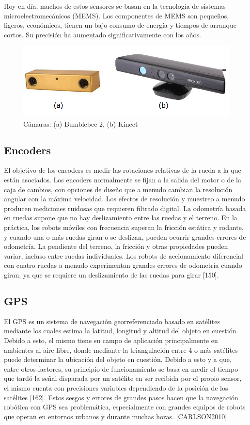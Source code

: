 Hoy en día, muchos de estos sensores se basan en la tecnología de sistemas microelectromecánicos (MEMS). Los componentes de MEMS son pequeños, ligeros, económicos, tienen un bajo consumo de energía y tiempos de arranque cortos. Su precisión ha aumentado significativamente con los años.

\begin{figure}
    \centering
    \includegraphics[width=.9\textwidth]{Img/bumblekinect}
    \caption{Cámaras: (a) Bumblebee 2, (b) Kinect}
    \label{fig:camaras}
\end{figure}

\subsection{Encoders}
El objetivo de los encoders es medir las rotaciones relativas de la rueda a la que están asociados. Los encoders normalmente se fijan a la salida del motor o de la caja de cambios, con opciones de diseño que a menudo cambian la resolución angular con la máxima velocidad. Los efectos de resolución y muestreo a menudo producen mediciones ruidosas que requieren filtrado digital. La odometría basada en ruedas supone que no hay deslizamiento entre las ruedas y el terreno. En la práctica, los robots móviles con frecuencia superan la fricción estática y rodante, y cuando una o más ruedas giran o se deslizan, pueden ocurrir grandes errores de odometría. La pendiente del terreno, la fricción y otras propiedades pueden variar, incluso entre ruedas individuales. Los robots de accionamiento diferencial con cuatro ruedas a menudo experimentan grandes errores de odometría cuando giran, ya que se requiere un deslizamiento de las ruedas para girar [150].

\subsection{GPS}
El GPS es un sistema de navegación georreferenciado basado en satélites mediante los cuales estima la latitud, longitud y altitud del objeto en cuestión. Debido a esto, el mismo tiene su campo de aplicación principalmente en ambientes al aire libre, donde mediante la triangulación entre 4 o más satélites puede determinar la ubicación del objeto en cuestión. Debido a esto y a que, entre otros factores, su principio de funcionamiento se basa en medir el tiempo que tardó la señal disparada por un satélite en ser recibida por el propio sensor, el mismo cuenta con precisiones variables dependiendo de la posición de los satélites [162]. Estos sesgos y errores de grandes pasos hacen que la navegación robótica con GPS sea problemática, especialmente con grandes equipos de robots que operan en entornos urbanos y durante muchas horas. [CARLSON2010]